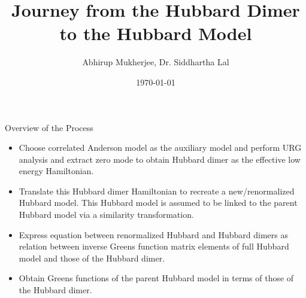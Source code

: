 \documentclass[aspectratio=169]{beamer}
\title{
\vspace*{\fill}
\LARGE{Journey from the Hubbard Dimer\\
to the Hubbard Model}
\vspace*{\fill}
}
\author{Abhirup Mukherjee, Dr. Siddhartha Lal}
\institute{Department of Physical Sciences\\IISER Kolkata}
\date{\today}
\begin{document}
\begin{frame}{}
\maketitle
\end{frame}

\begin{frame}{Overview of the Process}
\begin{itemize}[<alert@+>]
	\item Choose correlated Anderson model as the auxiliary model and perform URG analysis and extract zero mode to obtain Hubbard dimer as the effective low energy Hamiltonian.
	\item Translate this Hubbard dimer Hamiltonian to recreate a new/renormalized Hubbard model. This Hubbard model is assumed to be linked to the parent Hubbard model via a similarity transformation.
	\item Express equation between renormalized Hubbard and Hubbard dimers as relation between inverse Greens function matrix elements of full Hubbard model and those of the Hubbard dimer.
	\item Obtain Greens functions of the parent Hubbard model in terms of those of the Hubbard dimer.
\end{itemize}
\end{frame}
\end{document}
